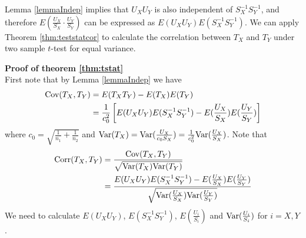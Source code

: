 Lemma \ref{lemmaIndep} implies that  $U_XU_Y$ is also independent of $S_X^{-1}S_Y^{-1}$, and
therefore $E(\frac{U_X}{S_X} \cdot\frac{U_Y}{S_Y})$ can be expressed as
$E(U_XU_Y)E(S_X^{-1}S_Y^{-1})$. We can apply Theorem \ref{thm:teststatcor} to calculate the 
correlation between $T_X$ and $T_Y$ under two sample $t$-test for equal variance. 

\textbf{Proof of theorem \ref{thm:tstat}} \\
First note that by Lemma  \ref{lemmaIndep} we have
\begin{align*}
\text{Cov}(T_X, T_Y) &= E(T_XT_Y) - E(T_X)E(T_Y) \\
& = \frac{1}{c_0^2} \left[E(U_XU_Y)E(S_X^{-1}S_Y^{-1}) - E(\frac{U_X}{S_X})E( 
\frac{U_Y}{S_Y})\right]   
\end{align*}
where $c_0 = \sqrt{\frac{1}{n_1} + \frac{1}{n_2}}$ and $\text{Var}(T_X) = \text{Var}(\frac{U_X}{c_0S_X})=
\frac{1}{c_0^2}\text{Var}(\frac{U_X}{S_X})$. 
Note that 
\begin{equation}\label{eq:Tcorrelation}
\begin{aligned}
\text{Corr}(T_X, T_Y) & = \frac{\text{Cov}(T_X, T_Y) }{\sqrt{\text{Var}(T_X) \text{Var}(T_Y) }} \\
& = \frac{E(U_XU_Y)E(S_X^{-1}S_Y^{-1}) - E(\frac{U_X}{S_X})E(
	\frac{U_Y}{S_Y})}{\sqrt{\text{Var}(\frac{U_X}{S_X})\text{Var}(\frac{U_Y}{S_Y})}} 
\end{aligned}
\end{equation}
We need to calculate $E(U_XU_Y)$, $E(S_X^{-1}S_Y^{-1})$, $ E(\frac{U_i}{S_i})$ and
$\text{Var}(\frac{U_i}{S_i})$ for $i =X, Y$. 

